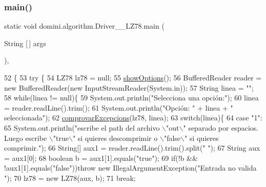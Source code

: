 \subsubsection{\texorpdfstring{main()}{main()}}
{\footnotesize\ttfamily static void domini.\+algorithm.\+Driver\+\_\+\+\_\+\+L\+Z78.\+main (\begin{DoxyParamCaption}\item[{String \mbox{[}$\,$\mbox{]}}]{args }\end{DoxyParamCaption})\hspace{0.3cm}{\ttfamily [inline]}, {\ttfamily [static]}}


\begin{DoxyCode}
52                                            \{
53     \textcolor{keywordflow}{try} \{
54         LZ78 lz78 = null;
55         \hyperlink{classdomini_1_1algorithm_1_1Driver____LZ78_af5e77bd40dbe6c3fa84ee5ee996b6dfe}{showOptions}();
56         BufferedReader reader = \textcolor{keyword}{new} BufferedReader(\textcolor{keyword}{new} InputStreamReader(System.in));
57         String linea = \textcolor{stringliteral}{""};
58         \textcolor{keywordflow}{while}(linea != null)\{
59             System.out.println(\textcolor{stringliteral}{"Selecciona una opción:"});
60             linea = reader.readLine().trim();
61             System.out.println(\textcolor{stringliteral}{"Opción: "} + linea + \textcolor{stringliteral}{" seleccionada"});
62             \hyperlink{classdomini_1_1algorithm_1_1Driver____LZ78_a21b185a3310ced322a1eb1b49f889f15}{comprovarExcepcions}(lz78, linea);
63             \textcolor{keywordflow}{switch}(linea)\{
64                 \textcolor{keywordflow}{case} \textcolor{stringliteral}{"1"}:
65                     System.out.println(\textcolor{stringliteral}{"escribe el path del archivo \(\backslash\)"out\(\backslash\)" separado por espacios. Luego
       escribe \(\backslash\)"true\(\backslash\)" si quieres descomprimir o \(\backslash\)"false\(\backslash\)" si quieres comprimir."});
66                     String[] aux1 = reader.readLine().trim().split(\textcolor{stringliteral}{" "});
67                     String aux = aux1[0];
68                     \textcolor{keywordtype}{boolean} b = aux1[1].equals(\textcolor{stringliteral}{"true"});
69                     \textcolor{keywordflow}{if}(!b && !aux1[1].equals(\textcolor{stringliteral}{"false"}))\textcolor{keywordflow}{throw} \textcolor{keyword}{new} IllegalArgumentException(\textcolor{stringliteral}{"Entrada no valida
      "});
70                     lz78 = \textcolor{keyword}{new} LZ78(aux, b);
71                 \textcolor{keywordflow}{break};

\end{DoxyCode}
